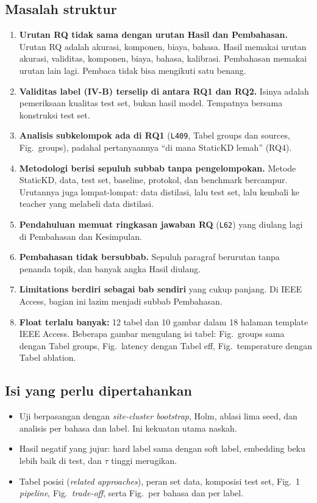 \documentclass[10pt,a4paper]{article}
\newcommand{\old}[1]{\texttt{L#1}}
\begin{document}
\subsection{Masalah struktur}
\begin{enumerate}
  \item \textbf{Urutan RQ tidak sama dengan urutan Hasil dan Pembahasan.} Urutan RQ adalah akurasi, komponen, biaya, bahasa. Hasil memakai urutan akurasi, validitas, komponen, biaya, bahasa, kalibrasi. Pembahasan memakai urutan lain lagi. Pembaca tidak bisa mengikuti satu benang.
  \item \textbf{Validitas label (IV-B) terselip di antara RQ1 dan RQ2.} Isinya adalah pemeriksaan kualitas test set, bukan hasil model. Tempatnya bersama konstruksi test set.
  \item \textbf{Analisis subkelompok ada di RQ1} (\old{409}, Tabel groups dan sources, Fig.~groups), padahal pertanyaannya ``di mana StaticKD lemah'' (RQ4).
  \item \textbf{Metodologi berisi sepuluh subbab tanpa pengelompokan.} Metode StaticKD, data, test set, baseline, protokol, dan benchmark bercampur. Urutannya juga lompat-lompat: data distilasi, lalu test set, lalu kembali ke teacher yang melabeli data distilasi.
  \item \textbf{Pendahuluan memuat ringkasan jawaban RQ} (\old{62}) yang diulang lagi di Pembahasan dan Kesimpulan.
  \item \textbf{Pembahasan tidak bersubbab.} Sepuluh paragraf berurutan tanpa penanda topik, dan banyak angka Hasil diulang.
  \item \textbf{Limitations berdiri sebagai bab sendiri} yang cukup panjang. Di IEEE Access, bagian ini lazim menjadi subbab Pembahasan.
  \item \textbf{Float terlalu banyak:} 12 tabel dan 10 gambar dalam 18 halaman template IEEE Access. Beberapa gambar mengulang isi tabel: Fig.~groups sama dengan Tabel groups, Fig.~latency dengan Tabel eff, Fig.~temperature dengan Tabel ablation.
\end{enumerate}

\subsection{Isi yang perlu dipertahankan}
\begin{itemize}
  \item Uji berpasangan dengan \emph{site-cluster bootstrap}, Holm, ablasi lima seed, dan analisis per bahasa dan label. Ini kekuatan utama naskah.
  \item Hasil negatif yang jujur: hard label sama dengan soft label, embedding beku lebih baik di test, dan $\tau$ tinggi merugikan.
  \item Tabel posisi (\emph{related approaches}), peran set data, komposisi test set, Fig.~1 \emph{pipeline}, Fig.~\emph{trade-off}, serta Fig.~per bahasa dan per label.
\end{itemize}
\end{document}
